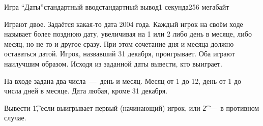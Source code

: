 \begin{problem}{Игра ``Даты''}{стандартный ввод}{стандартный вывод}{1 секунда}{256 мегабайт}

Играют двое. Задаётся какая-то дата 2004 года. Каждый игрок на своём ходе называет более позднюю дату, увеличивая на 1 или 2 либо день в месяце, либо месяц, но не то и другое сразу. При этом сочетание дня и месяца должно оставаться датой. Игрок, назвавший 31 декабря, проигрывает. Оба играют наилучшим образом. Исходя из заданной даты вывести, кто выиграет.

\InputFile
На входе задана два числа~---~день и месяц. Месяц от 1 до 12, день от 1 до числа дней в месяце. Дата любая, кроме 31 декабря.

\OutputFile
Вывести \t{1}, если выигрывает первый (начинающий) игрок, или \t{2}~---~в противном случае.

\Examples

\begin{example}
%
%
%
\end{example}

\end{problem}

